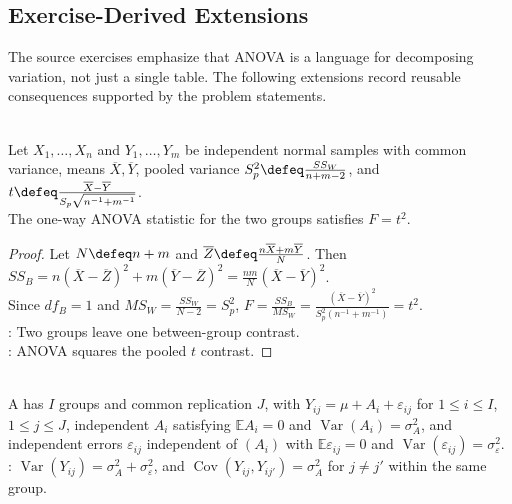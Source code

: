 \subsection{Exercise-Derived Extensions}

The source exercises emphasize that ANOVA is a language for decomposing variation, not just a single table.  The following extensions record reusable consequences supported by the problem statements.

\begin{corollary} \label{cor:two-treatment-one-way-anova-equals-pooled-t} \\
Let $X_1,\ldots,X_n$ and $Y_1,\ldots,Y_m$ be independent normal samples with common variance, means $\overline{X},\overline{Y}$, pooled variance $S_p^2\defeq \frac{SS_W}{n+m-2}$, and $t\defeq\frac{\overline{X}-\overline{Y}}{S_p\sqrt{n^{-1}+m^{-1}}}$.\\
The one-way ANOVA statistic for the two groups satisfies $F=t^2$.
\begin{proof} Let $N\defeq n+m$ and $\overline{Z}\defeq\frac{n\overline{X}+m\overline{Y}}{N}$. Then $SS_B=n(\overline{X}-\overline{Z})^2+m(\overline{Y}-\overline{Z})^2=\frac{nm}{N}(\overline{X}-\overline{Y})^2$.\\
Since $df_B=1$ and $MS_W=\frac{SS_W}{N-2}=S_p^2$, $F=\frac{SS_B}{MS_W}=\frac{(\overline{X}-\overline{Y})^2}{S_p^2(n^{-1}+m^{-1})}=t^2$.\\
: Two groups leave one between-group contrast.\\
: ANOVA squares the pooled $t$ contrast.
\end{proof}
\end{corollary}

\begin{definition} \label{def:one-way-random-effects-model} \\
A  has $I$ groups and common replication $J$, with $Y_{ij}=\mu+A_i+\varepsilon_{ij}$ for $1\leq i\leq I$, $1\leq j\leq J$, independent $A_i$ satisfying $\mathbb{E}A_i=0$ and $\operatorname{Var}(A_i)=\sigma_A^2$, and independent errors $\varepsilon_{ij}$ independent of $(A_i)$ with $\mathbb{E}\varepsilon_{ij}=0$ and $\operatorname{Var}(\varepsilon_{ij})=\sigma_\varepsilon^2$.\\
: $\operatorname{Var}(Y_{ij})=\sigma_A^2+\sigma_\varepsilon^2$, and $\operatorname{Cov}(Y_{ij},Y_{ij'})=\sigma_A^2$ for $j\ne j'$ within the same group.
\end{definition}

